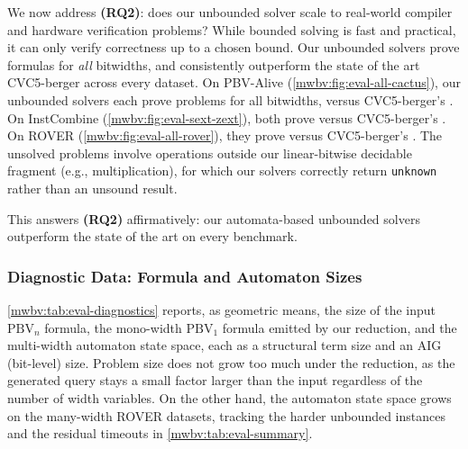 We now address \textbf{(RQ2)}: does our unbounded solver scale to real-world compiler and hardware verification problems?
While bounded solving is fast and practical,
it can only verify correctness up to a chosen bound.
Our unbounded solvers prove formulas for \emph{all} bitwidths,
and consistently outperform the state of the art CVC5-berger across every dataset.
On PBV-Alive (\cref{mwbv:fig:eval-all-cactus}), our unbounded solvers each prove \AliveCactusNumSolvedMr{} problems for all bitwidths,
versus CVC5-berger's \AliveCactusNumSolvedC{}.
On InstCombine (\cref{mwbv:fig:eval-sext-zext}), both prove \SextZextInstcombineNumSolvedMr{} versus CVC5-berger's \SextZextInstcombineNumSolvedC{}.
On ROVER (\cref{mwbv:fig:eval-all-rover}), they prove \RoverCactusNumSolvedMr{} versus CVC5-berger's \RoverCactusNumSolvedC{}.
The unsolved problems involve operations outside our linear-bitwise decidable fragment
(e.g., multiplication), for which our solvers correctly return \texttt{unknown}
rather than an unsound result.

This answers \textbf{(RQ2)} affirmatively: our automata-based unbounded solvers outperform the state of the art on every benchmark.

\subsubsection{Diagnostic Data: Formula and Automaton Sizes}
\label{mwbv:sec:diagnostics}

\cref{mwbv:tab:eval-diagnostics} reports, as geometric means, the size of the
input $\text{PBV}_n$ formula, the mono-width $\text{PBV}_1$ \qfbv{} formula
emitted by our reduction, and the multi-width automaton state space, each as a
structural term size and an AIG (bit-level) size.
Problem size does not grow too much under the reduction, as the generated \qfbv{}
query stays a small factor larger than the input regardless of the number of
width variables. On the other hand, the automaton state space grows on the many-width ROVER
datasets, tracking the harder unbounded instances and the
residual timeouts in \cref{mwbv:tab:eval-summary}.

\begin{table}[htb]
\centering
\caption{Size diagnostics across the three datasets, reported as geometric means.
For each dataset we give the size of the input $\text{PBV}_n$ formula, the
mono-width $\text{PBV}_1$ \qfbv{} formula emitted by our reduction, and the
multi-width automaton state space, each measured both as a structural term size
(AST nodes) and as an AIG (bit-level) size. The $\text{PBV}_1$ formula stays a
small constant factor larger than the input, confirming the linear-size
reduction; the automaton state space grows on the many-width datasets, tracking
the harder unbounded instances.}
\label{mwbv:tab:eval-diagnostics}

\end{table}

